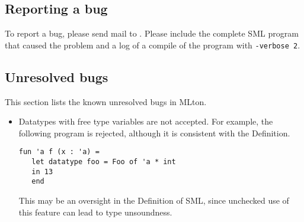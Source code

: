 %
\subsection{Reporting a bug}

To report a bug, please send mail to {\mltonmail}.  Please include the
complete SML program that caused the problem and a log of a compile of
the program with {\tt -verbose 2}.
%
\subsection{Unresolved bugs}

This section lists the known unresolved bugs in MLton.

\begin{itemize}

\item
Datatypes with free type variables are not accepted.  For example,
the following program is rejected, although it is consistent with the
Definition.
\begin{verbatim}
fun 'a f (x : 'a) =
   let datatype foo = Foo of 'a * int
   in 13
   end
\end{verbatim}
This may be an oversight in the Definition of SML, since unchecked use
of this feature can lead to type unsoundness.

\end{itemize}
